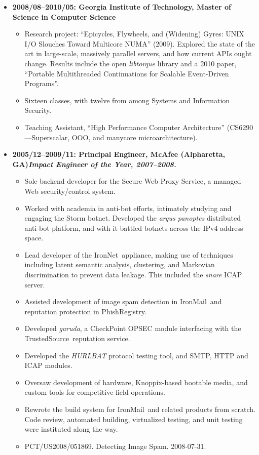 \documentclass{article}
\newenvironment{tightitemize}
{\begin{itemize}
  \setlength{\itemsep}{1pt}
  \setlength{\parskip}{0pt}
  \setlength{\parsep}{0pt}}
{\end{itemize}}
\begin{document}
\begin{tightitemize}
\item \textbf{2008/08--2010/05: Georgia Institute of Technology, Master of Science in Computer Science}
\begin{tightitemize}
\item Research project: ``Epicycles, Flywheels, and (Widening) Gyres: UNIX I/O
  Slouches Toward Multicore NUMA'' (2009). Explored the state of the art in
  large-scale, massively parallel servers, and how current APIs ought
  change. Results include the open \textit{libtorque} library and a 2010 paper,
  ``Portable Multithreaded Continuations for Scalable Event-Driven Programs''.
\item Sixteen classes, with twelve from among Systems and Information Security.
\item Teaching Assistant, ``High Performance Computer Architecture'' (CS6290---Superscalar, OOO, and manycore microarchitecture).\\
\end{tightitemize}

\item \textbf{2005/12--2009/11: Principal Engineer, McAfee (Alpharetta, GA)\hfill \tiny{\textit{Impact Engineer of the Year, 2007--2008.}}}
\begin{tightitemize}
\item Sole backend developer for the Secure Web Proxy Service, a managed Web
  security/control system.
\item Worked with academia in anti-bot efforts, intimately studying and engaging
  the Storm botnet. Developed the \textit{argus panoptes} distributed anti-bot
  platform, and with it battled botnets across the IPv4 address space.
\item Lead developer of the IronNet\texttrademark\ appliance, making use of techniques
  including latent semantic analysis, clustering, and Markovian discrimination
  to prevent data leakage. This included the \textit{snare} ICAP server.
\item Assisted development of image spam detection in IronMail\texttrademark\ and
  reputation protection in PhishRegistry\texttrademark.
\item Developed \textit{garuda}, a CheckPoint\textsuperscript{\textregistered} OPSEC module interfacing with the
  TrustedSource\texttrademark\ reputation service.
\item Developed the \textit{HURLBAT} protocol testing tool, and SMTP, HTTP and ICAP modules.
\item Oversaw development of hardware, Knoppix\textsuperscript{\textregistered}-based bootable media, and custom tools for competitive field operations.
\item Rewrote the build system for IronMail\texttrademark\ and related products from scratch.
  Code review, automated building, virtualized testing, and unit testing were
  instituted along the way.
\item PCT/US2008/051869. Detecting Image Spam. 2008-07-31.\hfill{}\\
\end{tightitemize}


\end{tightitemize}
\end{document}

